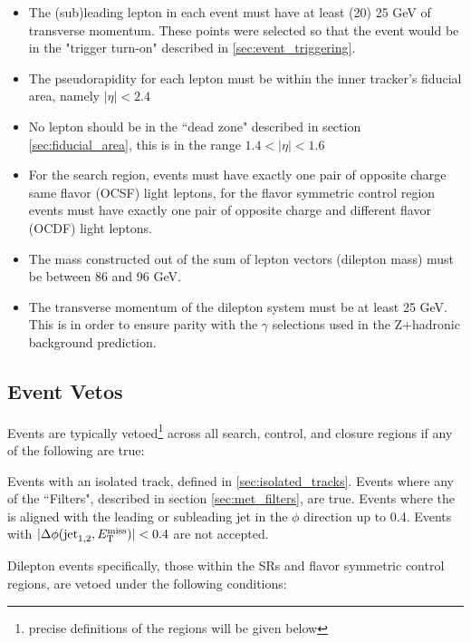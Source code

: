     \begin{itemize}
      \item The (sub)leading lepton in each event must have at least (20) 25 GeV of transverse momentum. These points were selected so that the event would be in the "trigger turn-on" described in \ref{sec:event_triggering}.
      \item The pseudorapidity for each lepton must be within the inner tracker's fiducial area, namely $\left|\eta\right| < 2.4$
      \item No lepton should be in the ``dead zone" described in section \ref{sec:fiducial_area}, this is in the range $1.4 < \left|\eta\right| < 1.6$
      \item For the search region, events must have exactly one pair of opposite charge same flavor (OCSF) light leptons, for the flavor symmetric control region events must have exactly one pair of opposite charge and different flavor (OCDF) light leptons.
      \item The mass constructed out of the sum of lepton vectors (dilepton mass) must be between 86 and 96 GeV.
      \item The transverse momentum of the dilepton system must be at least 25 GeV. This is in order to ensure parity with the $\gamma$ selections used in the Z+hadronic background prediction.
    \end{itemize}

  \subsection{Event Vetos} \label{sec:event_vetos}
    Events are typically vetoed\footnote{precise definitions of the regions will be given below} across all search, control, and closure regions if any of the following are true:

    \begin{description}
       Events with an isolated track, defined in \ref{sec:isolated_tracks}.
       Events where any of the ``\MET Filters", described in section \ref{sec:met_filters}, are true.
       Events where the \MET is aligned with the leading or subleading jet in the $\phi$ direction up to 0.4. Events with $\lvert \Delta \phi(\text{jet}_{1,2},E_{\mathrm{T}}^{\text{miss}}) \rvert < 0.4$ are not accepted. 
    \end{description}

    Dilepton events specifically, those within the SRs and flavor symmetric control regions, are vetoed under the following conditions:

